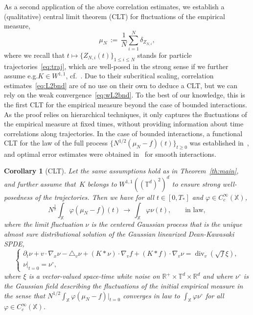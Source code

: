 \documentclass[a4paper,11pt,reqno,noindent]{amsart}
\theoremstyle{plain}
\newtheorem{cor}[theor]{Corollary}
\theoremstyle{definition}
\numberwithin{equation}{section}
\newcommand{\Xd}{\mathbb X}
\newcommand{\R}{\mathbb R}
\newcommand{\T}{\mathbb T}
\newcommand{\Div}{{\operatorname{div}}}
\begin{document}
As a second application of the above correlation estimates, we establish a (qualitative) central limit theorem (CLT) for fluctuations of the empirical measure,
\[\mu_N\,:=\,\textstyle\frac1N\sum_{i=1}^N\delta_{Z_{N,i}},\]
where we recall that $t\mapsto\{Z_{N,i}(t)\}_{1\le i\le N}$ stands for particle trajectories~\eqref{eq:traj}, which are well-posed in the strong sense if we further assume e.g.\@ $K\in W^{1,1}$, cf.~\cite{Champagnat-Jabin,LeBris-Lions-19}. Due to their subcritical scaling, correlation estimates~\eqref{eq:L2bnd} are of no use on their own to deduce a CLT, but we can rely on the weak convergence~\eqref{eq:wL2bnd}.
To the best of our knowledge, this is the first CLT for the empirical measure beyond the case of bounded interactions.
As the proof relies on hierarchical techniques, it only captures the fluctuations of the empirical measure at fixed times, without providing information about time correlations along trajectories.
In the case of bounded interactions, a functional CLT for the law of the full process $\{N^{1/2}(\mu_N-f)(t)\}_{t\ge0}$ was established in~\cite{Wang-Zhao-Zhu-23}, and optimal error estimates were obtained in~\cite{D-21,BD_2024} for smooth interactions.

\begin{cor}[CLT]\label{cor:CLT}
Let the same assumptions hold as in Theorem~\ref{th:main}, and further assume that~$K$ belongs to $W^{1,1}((\T^d)^2)^d$ to ensure strong well-posedness of the trajectories. Then we have for all $t\in[0,T_*]$ and $\varphi\in C^\infty_c(\Xd)$,
\begin{equation}\label{eq:CLT-conv}
N^\frac12\int_\Xd\varphi(\mu_N-f)(t)\,\to\,\int_\Xd\varphi\nu(t),\qquad\text{in law},
\end{equation}
where the limit fluctuation $\nu$ is the centered Gaussian process that is the unique almost sure distributional solution of the Gaussian linearized Dean-Kawasaki SPDE,
\[\left\{\begin{array}{l}
\partial_t\nu+v\cdot\nabla_x\nu-\triangle_v\nu+(K\ast\nu)\cdot\nabla_vf+(K\ast f)\cdot\nabla_v\nu=\Div_v(\sqrt f\xi),\\
\nu|_{t=0}=\nu^\circ,
\end{array}\right.\]
where $\xi$ is a vector-valued space-time white noise on $\R^+\times\T^d\times\R^d$ and where $\nu^\circ$ is the Gaussian field describing the fluctuations of the initial empirical measure in the sense that $N^{1/2}\int_\Xd\varphi(\mu_N-f)|_{t=0}$ converges in law to $\int_\Xd\varphi\nu^\circ$ for all $\varphi\in C^\infty_c(\Xd)$.
\end{cor}
\end{document}

